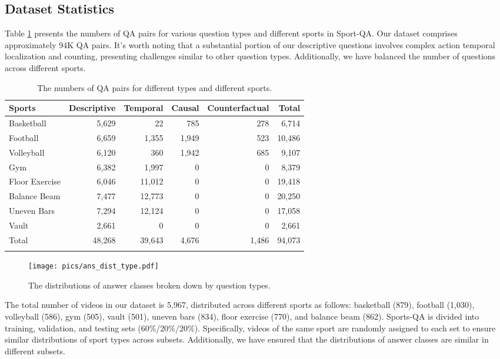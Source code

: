 \subsection{Dataset Statistics}

Table \ref{n_qa} presents the numbers of QA pairs for various question types and different sports in Sport-QA. Our dataset comprises approximately 94K QA pairs. It's worth noting that a substantial portion of our descriptive questions involves complex action temporal localization and counting, presenting challenges similar to other question types. Additionally, we have balanced the number of questions across different sports.

\begin{table}[tbp]
\caption{The numbers of QA pairs for different types and different sports.}
\label{n_qa}

\begin{tabular}{@{}lrrrrr@{}}
\toprule
 Sports       & Descriptive & Temporal & Causal & Counterfactual & Total  \\ \midrule
Basketball & 5,629 & 22    & 785    & 278      & 6,714  \\
Football   & 6,659 & 1,355 & 1,949  & 523      & 10,486 \\
Volleyball & 6,120 & 360   & 1,942  & 685      & 9,107  \\
Gym     & 6,382 & 1,997 & 0      & 0        & 8,379  \\
Floor Exercise      &  6,046      &  11,012     & 0      & 0        &   19,418     \\
Balance Beam       &   7,477     &   12,773    & 0      & 0        &   20,250     \\
Uneven Bars      &   7,294     &   12,124    & 0      & 0        &    17,058    \\
Vault      &   2,661     &   0    & 0      & 0       &   2,661     \\ \midrule
Total   &   48,268     &   39,643    & 4,676  & 1,486    &    94,073    \\ \botrule
\end{tabular}
\end{table}

\begin{figure*}[tbp]
\texttt{[image: pics/ans\_dist\_type.pdf]}
\caption{The distributions of answer classes broken down by question types.}
\label{ans_dist_type}
\end{figure*}

The total number of videos in our dataset is 5,967, distributed across different sports as follows: basketball (879), football (1,030), volleyball (586), gym (505), vault (501), uneven bars (834), floor exercise (770), and balance beam (862). Sports-QA is divided into training, validation, and testing sets (60\%/20\%/20\%). Specifically, videos of the same sport are randomly assigned to each set to ensure similar distributions of sport types across subsets. Additionally, we have ensured that the distributions of answer classes are similar in different subsets.

